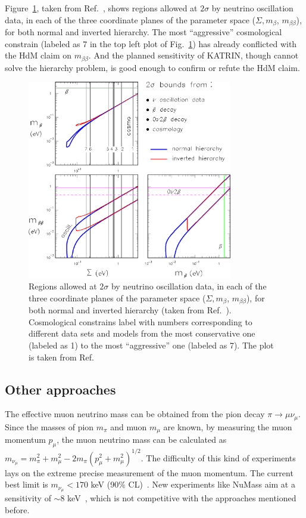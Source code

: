 Figure~\ref{fig:sum1b2b}, taken from Ref.~\cite{Fog07}, shows regions allowed at $2\sigma$ by neutrino oscillation data, in each of the three coordinate planes of the parameter space ($\Sigma, m_{\beta}$, $m_{\beta\beta}$), for both normal and inverted hierarchy. The most ``aggressive'' cosmological constrain (labeled as 7 in the top left plot of Fig.~\ref{fig:sum1b2b}) has already conflicted with the HdM claim on $m_{\beta\beta}$. And the planned sensitivity of KATRIN, though cannot solve the hierarchy problem, is good enough to confirm or refute the HdM claim.
\begin{figure}[tbhp]
  \centering
  \includegraphics[width=0.8\textwidth]{sum1b2b.eps}  
  \caption{Regions allowed at $2\sigma$ by neutrino oscillation data,     in each of the three coordinate planes of the parameter space     ($\Sigma, m_{\beta}$, $m_{\beta\beta}$), for both normal and     inverted hierarchy (taken from Ref.~\cite{Fog07}). Cosmological     constrains label with numbers corresponding to different data sets     and models from the most conservative one (labeled as 1) to the     most ``aggressive'' one (labeled as 7). The plot is taken from     Ref.}
  \label{fig:sum1b2b}
\end{figure}

\subsection{Other approaches}
\label{sec:otap}
The effective muon neutrino mass can be obtained from the pion decay $\pi \rightarrow \mu \nu_{\mu}$. Since the masses of pion $m_{\pi}$ and muon $m_{\mu}$ are known, by measuring the muon momentum $p_{\mu}$, the muon neutrino mass can be calculated as $m_{\nu_{\mu}} = m^{2}_{\pi} + m^{2}_{\mu} - 2m_{\pi} (p^{2}_{\mu} + m^{2}_{\mu})^{1/2}$. The difficulty of this kind of experiments lays on the extreme precise measurement of the muon momentum. The current best limit is $m_{\nu_{\mu}} < 170$ keV (90\% CL)~\cite{Ass96}. New experiments like NuMass aim at a sensitivity of $\sim 8$ keV~\cite{Num20}, which is not competitive with the approaches mentioned before.

